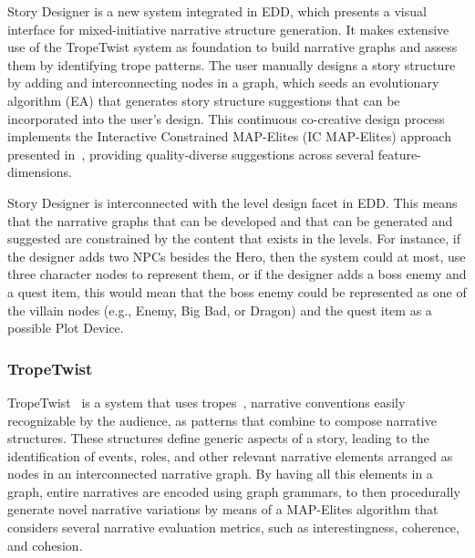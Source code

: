  
% 

Story Designer is a new system integrated in EDD, which presents a visual interface for mixed-initiative narrative structure generation. It makes extensive use of the TropeTwist system as foundation to build narrative graphs and assess them by identifying trope patterns. The user manually designs a story structure by adding and interconnecting nodes in a graph, which seeds an evolutionary algorithm (EA) that generates story structure suggestions that can be incorporated into the user's design. This continuous co-creative design process implements the Interactive Constrained MAP-Elites (IC MAP-Elites) approach presented in~, providing quality-diverse suggestions across several feature-dimensions.

Story Designer is interconnected with the level design facet in EDD. This means that the narrative graphs that can be developed and that can be generated and suggested are constrained by the content that exists in the levels. For instance, if the designer adds two NPCs besides the Hero, then the system could at most, use three character nodes to represent them, or if the designer adds a boss enemy and a quest item, this would mean that the boss enemy could be represented as one of the villain nodes (e.g., Enemy, Big Bad, or Dragon) and the quest item as a possible Plot Device.

\subsubsection{TropeTwist}

TropeTwist~ is a system that uses tropes~, narrative conventions easily recognizable by the audience, as patterns that combine to compose narrative structures. These structures define generic aspects of a story, leading to the identification of events, roles, and other relevant narrative elements arranged as nodes in an interconnected narrative graph. By having all this elements in a graph, entire narratives are encoded using graph grammars, to then procedurally generate novel narrative variations by means of a MAP-Elites algorithm that considers several narrative evaluation metrics, such as interestingness, coherence, and cohesion. 

